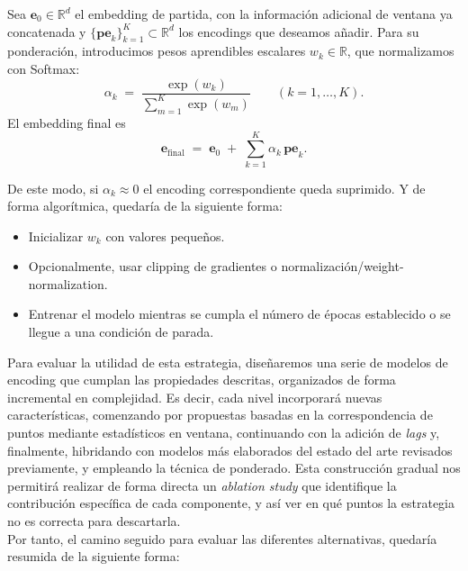 Sea \(\mathbf{e}_0\in\mathbb{R}^d\) el embedding de partida, con la información adicional de ventana ya concatenada y \(\{\mathbf{pe}_k\}_{k=1}^K \subset \mathbb{R}^d\) los encodings que deseamos añadir. Para su ponderación, introducimos pesos aprendibles escalares \(w_k\in\mathbb{R}\), que normalizamos con Softmax:
\[
\alpha_k \;=\; \frac{\exp(w_k)}{\sum_{m=1}^{K}\exp(w_m)} \qquad (k=1,\dots,K).
\]
El embedding final es
\[
\mathbf{e}_{\mathrm{final}} \;=\; \mathbf{e}_0 \;+\; \sum_{k=1}^{K} \alpha_k\,\mathbf{pe}_k.
\]


De este modo, si \(\alpha_k \approx 0\) el encoding correspondiente queda suprimido. Y de forma algorítmica, quedaría de la siguiente forma:
\begin{itemize}
	\item Inicializar \(w_k\) con valores pequeños.
	\item Opcionalmente, usar clipping de gradientes o normalización/weight-normalization.
	\item Entrenar el modelo mientras se cumpla el número de épocas establecido o se llegue a una condición de parada.
\end{itemize}


Para evaluar la utilidad de esta estrategia, diseñaremos una serie de modelos de encoding que cumplan las propiedades descritas, organizados de forma incremental en complejidad. Es decir, cada nivel incorporará nuevas características, comenzando por propuestas basadas en la correspondencia de puntos mediante estadísticos en ventana, continuando con la adición de \textit{lags} y, finalmente, hibridando con modelos más elaborados del estado del arte revisados previamente, y empleando la técnica de ponderado. Esta construcción gradual nos permitirá realizar de forma directa un \textit{ablation study} que identifique la contribución específica de cada componente, y así ver en qué puntos la estrategia no es correcta para descartarla.\\

Por tanto, el camino seguido para evaluar las diferentes alternativas, quedaría resumida de la siguiente forma:

